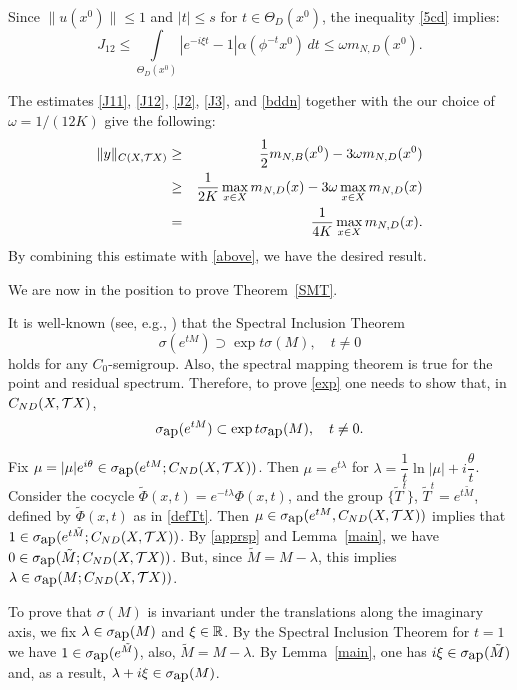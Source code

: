 \begin{pf}
Since $\|u(x^0)\|\le 1$ and $|t|\le s$
for $t\in \Theta_D(x^0)$, the inequality
\eqref{5cd} implies:
\begin{equation}\label{J12}
J_{12}\le
\int\limits_{\Theta_D(x^0)}\left|e^{-i\xi t}-1\right| \alpha
(\phi^{-t}x^0)\,dt \le \omega m_{N,D}(x^0).
\end{equation}

The estimates
\eqref{J11}, \eqref{J12}, \eqref{J2}, \eqref{J3}, and \eqref{bddn}
together with
the our choice of $\omega=1/(12K)$ give the following:
\begin{eqnarray*}
 \|y\|_{C(X,{{\cal{T}}X})} & \ge & {\displaystyle{1\over2}} m_{N,B}(x^0)- 3\omega
m_{N,D}(x^0)\\
 & \ge & {\displaystyle{1\over2K}}\max_{x\in X}m_{N,D}(x)
-3\omega\max_{x\in X}m_{N,D}(x)\\
& = & {\displaystyle{1\over4K}}\max_{x\in X}m_{N,D}(x).
\end{eqnarray*}
By combining this estimate with \eqref{above}, we have the desired result.
\end{pf}

We are now in the position  to prove Theorem~\ref{SMT}.

\begin{pf}
It is well-known (see, e.g., \cite{Pazy}) that the Spectral
Inclusion Theorem
 \begin{equation}\label{SIT}
\sigma (e^{tM}) \supset \exp t \sigma
(M), \quad t\neq 0
\end{equation}
 holds for any $C_0$-semigroup.
Also, the spectral mapping theorem is true for the point and
residual spectrum. Therefore,
to prove \eqref{exp} one needs to show
that,  in ${C_{ND}(X,{{\cal{T}}X})}$,
\[\sigma_{\mbox{ap}} (e^{tM}) \subset \exp t \sigma_{\mbox{ap}} (M), \quad t\neq 0.\]

Fix
$\mu=|\mu|e^{i\theta}\in\sigma_{\mbox{ap}}(e^{tM};{C_{ND}(X,{{\cal{T}}X})})$. Then $\mu=e^{t\lambda}$
for $\lambda=\dfrac{1}{t}\ln |\mu|+i\dfrac{\theta}{t}$. Consider
the cocycle $\tilde{\Phi}(x,t)=e^{-t\lambda}\Phi(x,t)$, and the
group $\{\tilde{T}^t\}$, $\tilde{T}^t=e^{t\tilde{M}}$,
defined by $\tilde{\Phi}(x,t)$ as in
\eqref{defTt}. Then $\mu\in\sigma_{\mbox{ap}}(e^{tM},{C_{ND}(X,{{\cal{T}}X})})$ implies that
$1\in\sigma_{\mbox{ap}}(e^{t\tilde{M}};{C_{ND}(X,{{\cal{T}}X})})$. By \eqref{apprsp}
and Lemma~\ref{main}, we have $0\in\sigma_{\mbox{ap}}(\tilde{M};{C_{ND}(X,{{\cal{T}}X})})$. But, since
$\tilde{M}=M-\lambda$, this implies $\lambda\in\sigma_{\mbox{ap}}(M;{C_{ND}(X,{{\cal{T}}X})})$.

To prove that $\sigma (M)$ is invariant under the translations
along the imaginary axis, we fix $\lambda\in\sigma_{\mbox{ap}}(M)$ and
$\xi\in{\Bbb{R}}$. By the Spectral Inclusion Theorem for $t=1$ we have
$1\in\sigma_{\mbox{ap}}(e^{\tilde{M}})$, also, $\tilde{M}=M-\lambda$. By
Lemma~\ref{main}, one has $i\xi\in\sigma_{\mbox{ap}}(\tilde{M})$ and, as a result,
$\lambda+i\xi\in\sigma_{\mbox{ap}}(M)$. \end{pf}

